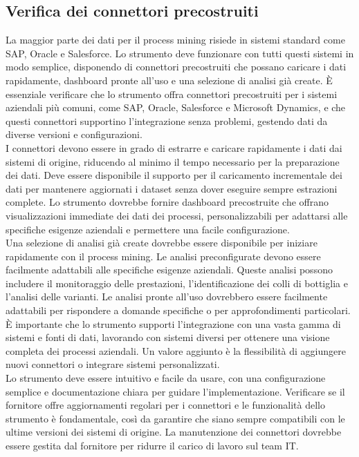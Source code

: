 \documentclass{article}
\begin{document}
\subsection{Verifica dei connettori precostruiti}
La maggior parte dei dati per il process mining risiede in sistemi standard come SAP, Oracle e Salesforce. Lo strumento deve funzionare con tutti questi sistemi in modo semplice, disponendo di connettori precostruiti che possano caricare i dati rapidamente, dashboard pronte all'uso e una selezione di analisi già create. È essenziale verificare che lo strumento offra connettori precostruiti per i sistemi aziendali più comuni, come SAP, Oracle, Salesforce e Microsoft Dynamics, e che questi connettori supportino l'integrazione senza problemi, gestendo dati da diverse versioni e configurazioni.\\
I connettori devono essere in grado di estrarre e caricare rapidamente i dati dai sistemi di origine, riducendo al minimo il tempo necessario per la preparazione dei dati. Deve essere disponibile il supporto per il caricamento incrementale dei dati per mantenere aggiornati i dataset senza dover eseguire sempre estrazioni complete. Lo strumento dovrebbe fornire dashboard precostruite che offrano visualizzazioni immediate dei dati dei processi, personalizzabili per adattarsi alle specifiche esigenze aziendali e permettere una facile configurazione.\\
Una selezione di analisi già create dovrebbe essere disponibile per iniziare rapidamente con il process mining. Le analisi preconfigurate devono essere facilmente adattabili alle specifiche esigenze aziendali. Queste analisi possono includere il monitoraggio delle prestazioni, l'identificazione dei colli di bottiglia e l'analisi delle varianti. Le analisi pronte all'uso dovrebbero essere facilmente adattabili per rispondere a domande specifiche o per approfondimenti particolari. È importante che lo strumento supporti l'integrazione con una vasta gamma di sistemi e fonti di dati, lavorando con sistemi diversi per ottenere una visione completa dei processi aziendali. Un valore aggiunto è la flessibilità di aggiungere nuovi connettori o integrare sistemi personalizzati.\\
Lo strumento deve essere intuitivo e facile da usare, con una configurazione semplice e documentazione chiara per guidare l'implementazione. Verificare se il fornitore offre aggiornamenti regolari per i connettori e le funzionalità dello strumento è fondamentale, così da garantire che siano sempre compatibili con le ultime versioni dei sistemi di origine. La manutenzione dei connettori dovrebbe essere gestita dal fornitore per ridurre il carico di lavoro sul team IT.
\end{document}
